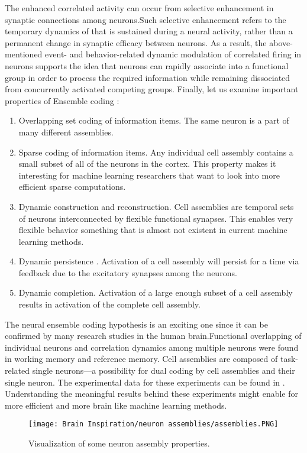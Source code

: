 \documentclass[12pt]{report}
\begin{document}
The enhanced correlated activity can occur from selective enhancement in synaptic connections among neurons.Such selective enhancement refers to the temporary dynamics of that is sustained during a neural activity, rather than a permanent change in synaptic efficacy between neurons. As a result, the above-mentioned event- and behavior-related dynamic modulation of correlated firing in neurons supports the idea that neurons can rapidly associate into a functional group in order to process the required information while remaining dissociated from concurrently activated competing groups. Finally, let us examine important properties of Ensemble coding :
\begin{enumerate}
    \item Overlapping set coding of information items. The same neuron is a part of many different assemblies.
    \item Sparse coding of information items. Any individual cell assembly contains a small subset of all of the neurons in the cortex. This property makes it interesting for machine learning researchers that want to look into more efficient sparse computations.
    \item Dynamic construction and reconstruction. Cell assemblies are temporal sets of neurons interconnected by flexible functional synapses. This enables very flexible behavior something that is almost not existent in current machine learning methods.
    \item Dynamic persistence . Activation of a cell assembly will persist for a time via feedback due to the excitatory synapses among the neurons.
    \item Dynamic completion. Activation of a large enough subset of a cell assembly results in activation of the complete cell assembly.
\end{enumerate}
The neural ensemble coding hypothesis is an exciting one since it can be confirmed by many research studies in the human brain.Functional overlapping of individual neurons and correlation dynamics among multiple neurons were found in working memory and reference memory.
Cell assemblies are composed of task-related single neurons—a possibility for dual coding by cell assemblies and their single neuron. The experimental data for these experiments can be found in \cite{sakurai1999}. Understanding the meaningful results behind these experiments might enable for more efficient and more brain like machine learning methods.  
\begin{figure}[htp]
    \texttt{[image: Brain Inspiration/neuron assemblies/assemblies.PNG]}
    \caption{Visualization of some neuron assembly properties.}
    \label{fig:assemblies}
\end{figure}
\end{document}
